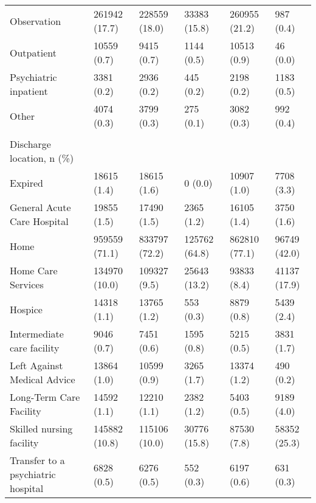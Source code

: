 \begin{adjustbox}{width={\textwidth},totalheight={\textheight},keepaspectratio,frame,padding=0ex 0ex -910ex 0ex}
{\begin{tabular}{L{20em}C{10em}C{10em}C{10em}C{10em}C{10em}}
\hspace{3mm} Observation & 261942 (17.7) & 228559 (18.0) & 33383 (15.8) & 260955 (21.2) & 987 (0.4)\\
\hspace{3mm} Outpatient & 10559 (0.7) & 9415 (0.7) & 1144 (0.5) & 10513 (0.9) & 46 (0.0)\\
\hspace{3mm} Psychiatric inpatient & 3381 (0.2) & 2936 (0.2) & 445 (0.2) & 2198 (0.2) & 1183 (0.5)\\
\hspace{3mm} Other & 4074 (0.3) & 3799 (0.3) & 275 (0.1) & 3082 (0.3) & 992 (0.4)\\
&  &  &  &  & \\
Discharge location, n (\%) & &    &     &        &         \\
\hspace{3mm} Expired & 18615 (1.4) & 18615 (1.6) &  0 (0.0) & 10907 (1.0) & 7708 (3.3)\\
\hspace{3mm} General Acute Care Hospital & 19855 (1.5) & 17490 (1.5) & 2365 (1.2) & 16105 (1.4) & 3750 (1.6)\\
\hspace{3mm} Home & 959559 (71.1) & 833797 (72.2) & 125762 (64.8) & 862810 (77.1) & 96749 (42.0)\\
\hspace{3mm} Home Care Services & 134970 (10.0) & 109327 (9.5) & 25643 (13.2) & 93833 (8.4) & 41137 (17.9)\\
\hspace{3mm} Hospice & 14318 (1.1) & 13765 (1.2) & 553 (0.3) & 8879 (0.8) & 5439 (2.4)\\
\hspace{3mm} Intermediate care facility & 9046 (0.7) & 7451 (0.6) & 1595 (0.8) & 5215 (0.5) & 3831 (1.7)\\
\hspace{3mm} Left Against Medical Advice & 13864 (1.0) & 10599 (0.9) & 3265 (1.7) & 13374 (1.2) & 490 (0.2)\\
\hspace{3mm} Long-Term Care Facility & 14592 (1.1) & 12210 (1.1) & 2382 (1.2) & 5403 (0.5) & 9189 (4.0)\\
\hspace{3mm} Skilled nursing facility & 145882 (10.8) & 115106 (10.0) & 30776 (15.8) & 87530 (7.8) & 58352 (25.3)\\
\hspace{3mm} Transfer to a psychiatric hospital & 6828 (0.5) & 6276 (0.5) & 552 (0.3) & 6197 (0.6) & 631 (0.3)\\

\end{tabular}}
\end{adjustbox}
